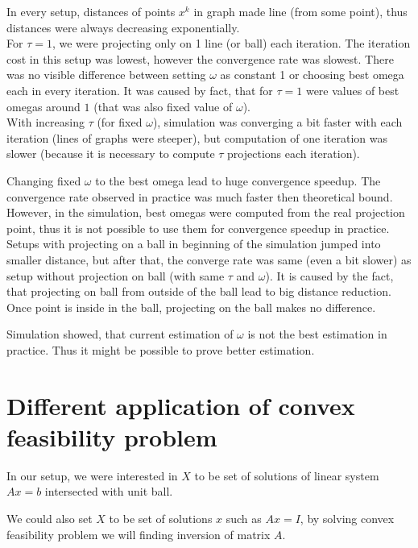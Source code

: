 \documentclass[11pt]{book}
\begin{document}
In every setup, distances of points $x^k$ in graph made line (from some point), thus distances were always decreasing exponentially.\\

For $\tau=1$, we were projecting only on 1 line (or ball) each iteration. The iteration cost in this setup was lowest, however the convergence rate was slowest. There was no visible difference between setting $\omega$ as constant 1 or choosing best omega each in every iteration. It was caused by fact, that for $\tau=1$ were values of best omegas around $1$ (that was also fixed value of $\omega$).\\

With increasing $\tau$ (for fixed $\omega$), simulation was converging a bit faster with each iteration (lines of graphs were steeper), but computation of one iteration was slower (because it is necessary to compute $\tau$ projections each iteration).

Changing fixed $\omega$ to the best omega lead to huge convergence speedup. The convergence rate observed in practice was much faster then theoretical bound. However, in the simulation, best omegas were computed from the real projection point, thus it is not possible to use them for convergence speedup in practice.\\

Setups with projecting on a ball in beginning of the simulation jumped into smaller distance, but after that, the converge rate was same (even a bit slower) as setup without projection on ball (with same $\tau$ and $\omega$). It is caused by the fact, that projecting on ball from outside of the ball lead to big distance reduction. Once point is inside in the ball, projecting on the ball makes no difference.

Simulation showed, that current estimation of $\omega$ is not the best estimation in practice. Thus it might be possible to prove better estimation.

\section{Different application of convex feasibility problem}

In our setup, we were interested in $X$ to be set of solutions of linear system $Ax=b$ intersected with unit ball.

We could also set $X$ to be set of solutions $x$ such as $Ax=I$, by solving convex feasibility problem we will finding inversion of matrix $A$.
\end{document}
